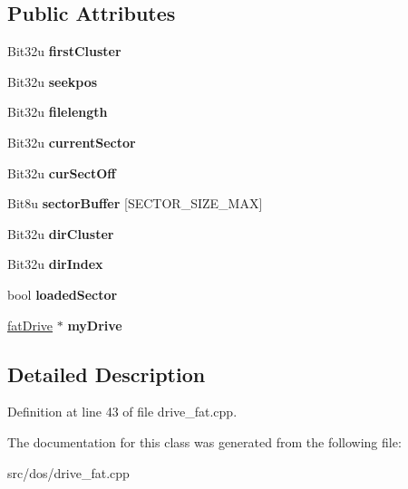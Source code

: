 \subsection*{Public Attributes}
\begin{DoxyCompactItemize}
\item 
\hypertarget{classfatFile_a0ab23d013d75299668159f7b5acfc20f}{Bit32u {\bfseries first\-Cluster}}\label{classfatFile_a0ab23d013d75299668159f7b5acfc20f}

\item 
\hypertarget{classfatFile_a5dfa3257680a81dc52f63616739d3b7b}{Bit32u {\bfseries seekpos}}\label{classfatFile_a5dfa3257680a81dc52f63616739d3b7b}

\item 
\hypertarget{classfatFile_ae14c4b0d1d3ba4940fd097128b8c9717}{Bit32u {\bfseries filelength}}\label{classfatFile_ae14c4b0d1d3ba4940fd097128b8c9717}

\item 
\hypertarget{classfatFile_a10d126dd6ea8e86ba96691e70f4d3795}{Bit32u {\bfseries current\-Sector}}\label{classfatFile_a10d126dd6ea8e86ba96691e70f4d3795}

\item 
\hypertarget{classfatFile_a310779605ffff594badf8dfb72738d36}{Bit32u {\bfseries cur\-Sect\-Off}}\label{classfatFile_a310779605ffff594badf8dfb72738d36}

\item 
\hypertarget{classfatFile_abdc7747a29ed56ef531c69e9a11ab6b1}{Bit8u {\bfseries sector\-Buffer} \mbox{[}S\-E\-C\-T\-O\-R\-\_\-\-S\-I\-Z\-E\-\_\-\-M\-A\-X\mbox{]}}\label{classfatFile_abdc7747a29ed56ef531c69e9a11ab6b1}

\item 
\hypertarget{classfatFile_a1496430cf7bc1f1d681fd66d08e12b5e}{Bit32u {\bfseries dir\-Cluster}}\label{classfatFile_a1496430cf7bc1f1d681fd66d08e12b5e}

\item 
\hypertarget{classfatFile_a0747fdfbf56e3cf6e6b91e9bb1b8a866}{Bit32u {\bfseries dir\-Index}}\label{classfatFile_a0747fdfbf56e3cf6e6b91e9bb1b8a866}

\item 
\hypertarget{classfatFile_ab7a7ff61e54c4ffa6c303924cd685c29}{bool {\bfseries loaded\-Sector}}\label{classfatFile_ab7a7ff61e54c4ffa6c303924cd685c29}

\item 
\hypertarget{classfatFile_ac3d9bcecc8822018478fa69b54e0367f}{\hyperlink{classfatDrive}{fat\-Drive} $\ast$ {\bfseries my\-Drive}}\label{classfatFile_ac3d9bcecc8822018478fa69b54e0367f}

\end{DoxyCompactItemize}


\subsection{Detailed Description}


Definition at line 43 of file drive\-\_\-fat.\-cpp.



The documentation for this class was generated from the following file\-:\begin{DoxyCompactItemize}
\item 
src/dos/drive\-\_\-fat.\-cpp\end{DoxyCompactItemize}

